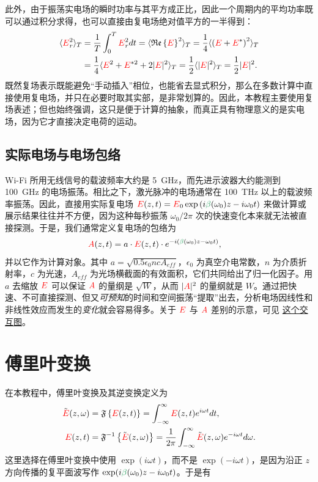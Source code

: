 此外，由于振荡实电场的瞬时功率与其平方成正比，因此一个周期内的平均功率既可以通过积分求得，也可以直接由复电场绝对值平方的一半得到：
\begin{align}
\label{eq:average_power}
    \langle \textcolor{red}{E}_r^2 \rangle_T&= \frac{1}{T}\int_{0}^{T} \textcolor{red}{E}_r^2 dt = \langle\mathfrak{Re}\left\{\textcolor{red}{E}\right\}^2\rangle_T =\frac{1}{4}\langle\left(\textcolor{red}{E}+\textcolor{red}{E}^*\right)^2\rangle_T\\ \nonumber
&=\frac{1}{4}\langle \textcolor{red}{E}^2+\textcolor{red}{E}^{*2}+2|\textcolor{red}{E}|^2 \rangle_T=\frac{1}{2} \langle|\textcolor{red}{E}|^2\rangle_T=\frac{1}{2}|\textcolor{red}{E}|^2.
\end{align}
既然复场表示既能避免“手动插入”相位，也能省去显式积分，那么在多数计算中直接使用复电场，并只在必要时取其实部，是非常划算的。因此，本教程主要使用复场表述；但也始终强调，这只是便于计算的抽象，而真正具有物理意义的是实电场，因为它才直接决定电荷的运动。

\subsection{实际电场与电场包络}
Wi-Fi 所用无线信号的载波频率大约是 5~GHz，而先进示波器大约能测到 100~GHz 的电场振荡。相比之下，激光脉冲的电场通常在 100~THz 以上的载波频率振荡。因此，直接用实际复电场 $\E(z,t)=\E_0 \exp\left( i\betag(\omega_0)z-i\omega_0 t\right)$ 来做计算或展示结果往往并不方便，因为这种每秒振荡 $\omega_0/2\pi$ 次的快速变化本来就无法被直接探测。于是，我们通常定义复电场的包络为
\begin{align}
\label{eq:envelope}
    \A(z,t) &=a\cdot\E(z,t)\cdot e^{-i(\betag(\omega_0)z-\omega_0t)},
\end{align}
并以它作为计算对象。其中 $a=\sqrt{0.5\epsilon_0ncA_{eff}}$，$\epsilon_0$ 为真空介电常数，$n$ 为介质折射率，$c$ 为光速，$A_{eff}$ 为光场横截面的有效面积，它们共同给出了归一化因子。用 $a$ 去缩放 $\textcolor{red}{E}$ 可以保证 $\textcolor{red}{A}$ 的量纲是 $\sqrt{W}$，从而 $|\textcolor{red}{A}|^2$ 的量纲就是 $W$。通过把快速、不可直接探测、但又\emph{可预知}的时间和空间振荡“提取”出去，分析电场因线性和非线性效应而发生的\emph{变化}就会容易得多。关于 $\textcolor{red}{E}$ 与 $\textcolor{red}{A}$ 差别的示意，可见 \href{https://www.desmos.com/calculator/rsw2fn5af6 }{这个交互图}。



\section{傅里叶变换}

在本教程中，傅里叶变换及其逆变换定义为
\begin{align}
    \Tilde{\textcolor{red}{E}}(z,\omega) &= \mathfrak{F}\left\{\textcolor{red}{E}(z,t)\right\} = \int_{-\infty}^{\infty} \textcolor{red}{E}(z,t) e^{i\omega t} dt, \\ \nonumber
    \textcolor{red}{E}(z,t) &= \mathfrak{F}^{-1}\left\{\Tilde{\textcolor{red}{E}}(z,\omega)\right\} = \frac{1}{2\pi} \int_{-\infty}^{\infty} \Tilde{\textcolor{red}{E}}(z,\omega) e^{-i\omega t} d\omega.
\end{align}
这里选择在傅里叶变换中使用 $\exp(i\omega t)$，而不是 $\exp(-i\omega t)$，是因为沿正 $z$ 方向传播的复平面波写作 $\exp(i\betag(\omega_0)z-i\omega_0 t)$。于是有

